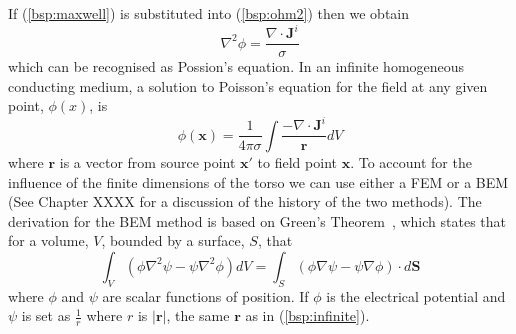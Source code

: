 If (\ref{bsp:maxwell}) is substituted into (\ref{bsp:ohm2}) then we obtain
\begin{equation}
\label{bsp:poisson}
\nabla^{2}\phi = \frac{\nabla \cdot \mathbf{J}^{i}}{\sigma}
\end{equation}
which can be recognised as Possion's equation.
In an infinite homogeneous conducting medium, a solution to Poisson's equation
for the field at any given point, $\phi\left(x\right)$, is~\cite{Plonsey1963}
\begin{equation}
\label{bsp:infinite}
\phi\left(\mathbf{x}\right) = \frac{1}{4 \pi \sigma} \int \frac{- \nabla \cdot
\mathbf{J}^{i} }{\mathbf{r}} dV
\end{equation}
where $\mathbf{r}$ is a vector from source point $\mathbf{x'}$ to field point $\mathbf{x}$.
To account for the influence of the finite dimensions of the torso we can use
either a FEM or a BEM (See Chapter XXXX for a discussion
of the history of the two methods).
The derivation for the BEM method is based on Green's Theorem~\cite{Barr1966},
which states that for a volume, $V$, bounded by a surface, $S$, that
\begin{equation}
\label{bsp:green}
\int_{V} \left(\phi \nabla^{2}\psi - \psi \nabla^{2}\phi  \right) dV =
\int_{S} \left( \phi \nabla \psi - \psi \nabla \phi \right) \cdot d\mathbf{S}
\end{equation}
where $\phi$ and $\psi$ are scalar functions of position.
If $\phi$ is the electrical potential and $\psi$ is set as $\frac{1}{r}$ where
$r$ is $|\mathbf{r}|$, the same $\mathbf{r}$ as in (\ref{bsp:infinite}).

